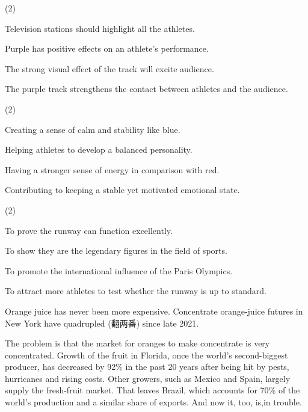 \documentclass{英语试卷}
\begin{document}
\begin{choices}(2)
  \item Television stations should highlight all the athletes.
  \item Purple has positive effects on an athlete's performance.
  \item The strong visual effect of the track will excite audience.
  \item The purple track strengthens the contact between athletes and the audience.
\end{choices}
\begin{choices}(2)
  \item Creating a sense of calm and stability like blue.
  \item Helping athletes to develop a balanced personality.
  \item Having a stronger sense of energy in comparison with red.
  \item Contributing to keeping a stable yet motivated emotional state.
\end{choices}
\begin{choices}(2)
  \item To prove the runway can function excellently.
  \item To show they are the legendary figures in the field of sports.
  \item To promote the international influence of the Paris Olympics.
  \item To attract more athletes to test whether the runway is up to standard.
\end{choices}
\par Orange juice has never been more expensive. Concentrate orange-juice futures in New York have quadrupled (翻两番) since late 2021.\par
\par The problem is that the market for oranges to make concentrate is very concentrated. Growth of the fruit in Florida, once the world's second-biggest producer, has decreased by 92\% in the past 20 years after being hit by pests, hurricanes and rising costs. Other growers, such as Mexico and Spain, largely supply the fresh-fruit market. That leaves Brazil, which accounts for 70\% of the world's production and a similar share of exports. And now it, too, is,in trouble.\par
\end{document}
